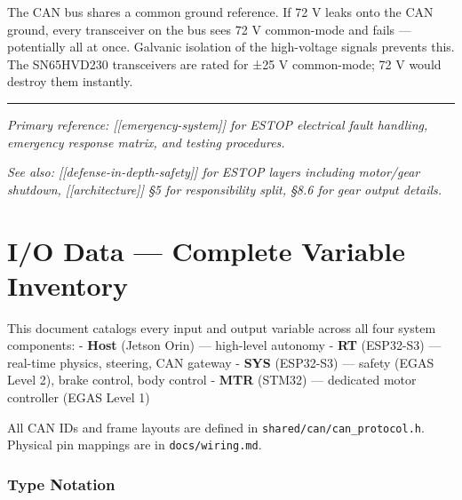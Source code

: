 \documentclass[12pt,a4paper,oneside]{report}
\begin{document}
The CAN bus shares a common ground reference. If 72 V leaks onto the CAN ground,
every transceiver on the bus sees 72 V common-mode and fails --- potentially all
at once. Galvanic isolation of the high-voltage signals prevents this. The
SN65HVD230 transceivers are rated for ±25 V common-mode; 72 V would destroy them
instantly.

\begin{center}\rule{0.5\linewidth}{0.5pt}\end{center}

\emph{Primary reference: {[}{[}emergency-system{]}{]} for ESTOP electrical fault
handling, emergency response matrix, and testing procedures.}

\emph{See also: {[}{[}defense-in-depth-safety{]}{]} for ESTOP layers including
motor/gear shutdown, {[}{[}architecture{]}{]} §5 for responsibility split, §8.6
for gear output details.}


\chapter{I/O Data --- Complete Variable
Inventory}\label{io-data-complete-variable-inventory}

This document catalogs every input and output variable across all four system
components: - \textbf{Host} (Jetson Orin) --- high-level autonomy - \textbf{RT}
(ESP32-S3) --- real-time physics, steering, CAN gateway - \textbf{SYS}
(ESP32-S3) --- safety (EGAS Level 2), brake control, body control - \textbf{MTR}
(STM32) --- dedicated motor controller (EGAS Level 1)

All CAN IDs and frame layouts are defined in
\texttt{shared/can/can\_protocol.h}. Physical pin mappings are in
\texttt{docs/wiring.md}.

\subsection{Type Notation}\label{type-notation}
\end{document}
